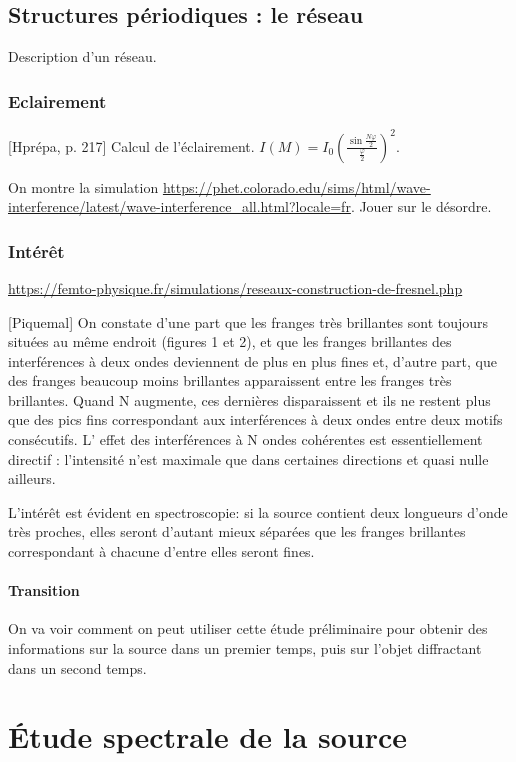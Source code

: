 \documentclass[11pt]{report}
\numberwithin{figure}{section}
\numberwithin{equation}{section}
\numberwithin{table}{section}
\newcommand{\1}{\boldsymbol{1}}
\begin{document}
\subsection{Structures périodiques : le réseau}


Description d'un réseau.

\subsubsection{Eclairement}

[Hprépa, p. 217] Calcul de l'éclairement. $I(M) = I_0 \left(\frac{\sin \frac{N \varphi}{2}}{\frac{\varphi}{2}}\right)^2$.

On montre la simulation \url{https://phet.colorado.edu/sims/html/wave-interference/latest/wave-interference_all.html?locale=fr}. Jouer sur le désordre. 


\subsubsection{Intérêt}

\url{https://femto-physique.fr/simulations/reseaux-construction-de-fresnel.php}

[Piquemal] On constate d'une part que les franges très brillantes sont toujours situées au même
endroit (figures 1 et 2), et que les
franges brillantes
des interférences à deux ondes
deviennent de plus en plus fines
et, d'autre part, que des franges beaucoup moins brillantes apparaissent entre les franges très brillantes. Quand N
augmente, ces dernières disparaissent et ils ne restent plus que des pics fins correspondant aux interférences à deux
ondes entre deux motifs consécutifs. L'
effet des interférences à N ondes cohérentes
est essentiellement directif : l'intensité n'est maximale que dans certaines directions et quasi nulle ailleurs.

L'intérêt est évident en spectroscopie: si la source contient deux longueurs d'onde très
proches, elles seront d'autant mieux séparées que les franges brillantes correspondant à
chacune d'entre elles seront fines.


\paragraph{Transition} On va voir comment on peut utiliser cette étude préliminaire pour obtenir des informations sur la source dans un premier temps, puis sur l'objet diffractant dans un second temps.

\section{Étude spectrale de la source}
\end{document}
